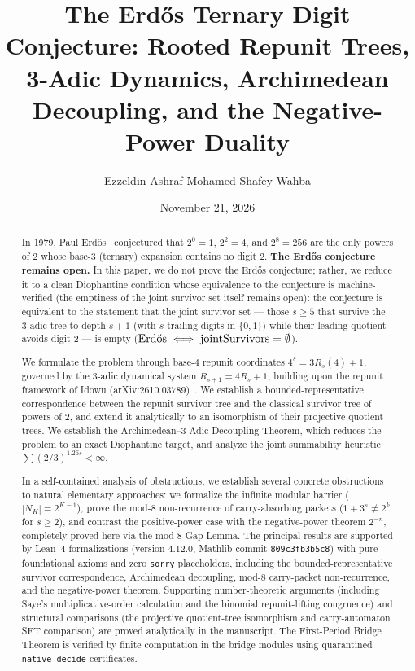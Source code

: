 \documentclass[11pt,reqno]{amsart}
\title[Rooted Repunit Trees, 3-Adic Dynamics, and Erd\H{o}s]{The Erd\H{o}s Ternary Digit Conjecture: Rooted Repunit Trees, 3-Adic Dynamics, Archimedean Decoupling, and the Negative-Power Duality}
\author{Ezzeldin Ashraf Mohamed Shafey Wahba}
\date{November 21, 2026}
\theoremstyle{plain}
\theoremstyle{definition}
\theoremstyle{remark}
\begin{document}
\begin{abstract}
In 1979, Paul Erd\H{o}s~\cite{Erdos1979} conjectured that $2^0 = 1$, $2^2 = 4$, and $2^8 = 256$ are the only powers of $2$ whose base-$3$ (ternary) expansion contains no digit $2$. \textbf{The Erd\H{o}s conjecture remains open.} In this paper, we do not prove the Erd\H{o}s conjecture; rather, we reduce it to a clean Diophantine condition whose equivalence to the conjecture is machine-verified (the emptiness of the joint survivor set itself remains open): the conjecture is equivalent to the statement that the joint survivor set --- those $s \ge 5$ that survive the $3$-adic tree to depth $s+1$ (with $s$ trailing digits in $\{0, 1\}$) while their leading quotient avoids digit $2$ --- is empty ($\text{Erd\H{o}s} \iff \mathrm{jointSurvivors} = \emptyset$). 

We formulate the problem through base-$4$ repunit coordinates $4^s = 3 R_s(4) + 1$, governed by the $3$-adic dynamical system $R_{s+1} = 4 R_s + 1$, building upon the repunit framework of Idowu (arXiv:2610.03789)~\cite{Idowu2026}. We establish a bounded-representative correspondence between the repunit survivor tree and the classical survivor tree of powers of $2$, and extend it analytically to an isomorphism of their projective quotient trees. We establish the Archimedean--$3$-Adic Decoupling Theorem, which reduces the problem to an exact Diophantine target, and analyze the joint summability heuristic $\sum (2/3)^{1.26s} < \infty$.

In a self-contained analysis of obstructions, we establish several concrete obstructions to natural elementary approaches: we formalize the infinite modular barrier ($|N_K| = 2^{K-1}$), prove the mod-$8$ non-recurrence of carry-absorbing packets ($1 + 3^s \ne 2^k$ for $s \ge 2$), and contrast the positive-power case with the negative-power theorem $2^{-n}$, completely proved here via the mod-$8$ Gap Lemma. The principal results are supported by Lean~4 formalizations (version 4.12.0, Mathlib commit \texttt{809c3fb3b5c8}) with pure foundational axioms and zero \texttt{sorry} placeholders, including the bounded-representative survivor correspondence, Archimedean decoupling, mod-$8$ carry-packet non-recurrence, and the negative-power theorem. Supporting number-theoretic arguments (including Saye's multiplicative-order calculation and the binomial repunit-lifting congruence) and structural comparisons (the projective quotient-tree isomorphism and carry-automaton SFT comparison) are proved analytically in the manuscript. The First-Period Bridge Theorem is verified by finite computation in the bridge modules using quarantined \texttt{native\_decide} certificates.
\end{abstract}
\end{document}
